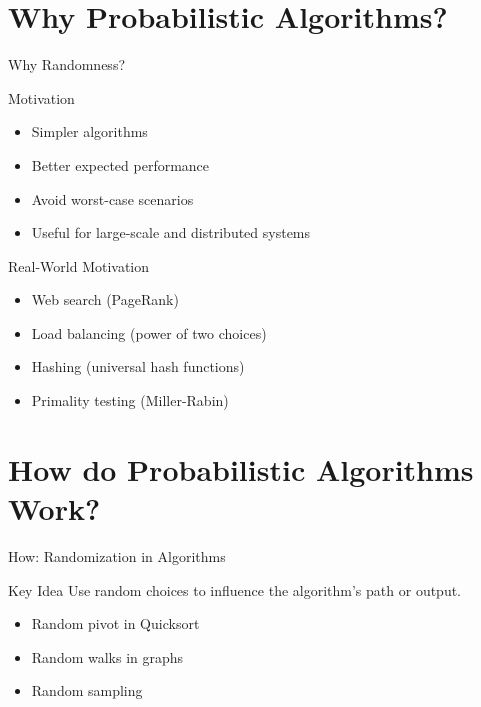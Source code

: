 \documentclass[aspectratio=169]{beamer}
\begin{document}
\section{Why Probabilistic Algorithms?}
\begin{frame}{Why Randomness?}
  \begin{block}{Motivation}
    \begin{itemize}
      \item Simpler algorithms

      \item Better expected performance

      \item Avoid worst-case scenarios

      \item Useful for large-scale and distributed systems
    \end{itemize}
  \end{block}
\end{frame}

\begin{frame}{Real-World Motivation}
  \begin{itemize}
    \item Web search (PageRank)

    \item Load balancing (power of two choices)

    \item Hashing (universal hash functions)

    \item Primality testing (Miller-Rabin)
  \end{itemize}
\end{frame}

\section{How do Probabilistic Algorithms Work?}
\begin{frame}{How: Randomization in Algorithms}
  \begin{block}{Key Idea}
    Use random choices to influence the algorithm's path or output.
  \end{block}

  \begin{itemize}
    \item Random pivot in Quicksort

    \item Random walks in graphs

    \item Random sampling
  \end{itemize}
\end{frame}
\end{document}
